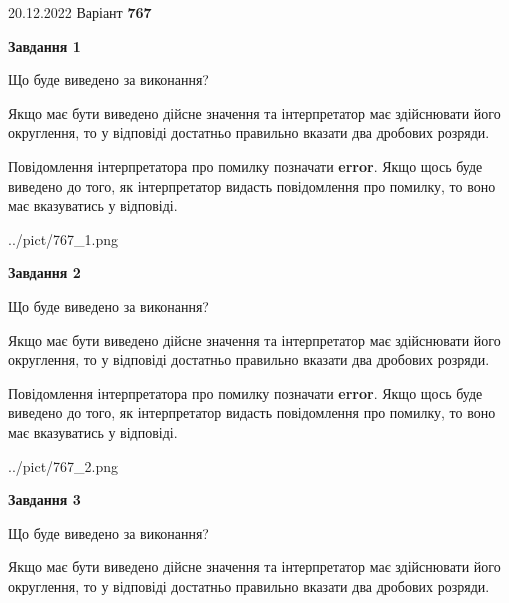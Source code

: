 \documentclass[12pt, ukrainian]{article}
\begin{document}
{20.12.2022 Варіант \No \textbf { 767 }\par}
{
\begin {Large}

{\begin {center}\textbf{Завдання 1}\end {center}}\par
Що буде виведено за виконання? \par

Якщо має бути виведено дійсне значення та інтерпретатор має здійснювати його округлення, 
то у відповіді достатньо правильно вказати два дробових розряди.

Повідомлення інтерпретатора про помилку позначати \textbf{error}.
Якщо щось буде виведено до того, як інтерпретатор видасть повідомлення про помилку, 
то воно має вказуватись у відповіді. \par

\begin{center}
	{../pict/767_1.png}
\end{center}
\newpage

{\begin {center}\textbf{Завдання 2}\end {center}}\par
Що буде виведено за виконання? \par

Якщо має бути виведено дійсне значення та інтерпретатор має здійснювати його округлення, 
то у відповіді достатньо правильно вказати два дробових розряди.

Повідомлення інтерпретатора про помилку позначати \textbf{error}.
Якщо щось буде виведено до того, як інтерпретатор видасть повідомлення про помилку, 
то воно має вказуватись у відповіді. \par

\begin{center}
	{../pict/767_2.png}
\end{center}
\newpage

{\begin {center}\textbf{Завдання 3}\end {center}}\par
Що буде виведено за виконання? \par

Якщо має бути виведено дійсне значення та інтерпретатор має здійснювати його округлення, 
то у відповіді достатньо правильно вказати два дробових розряди.


\end{Large}}
\end{document}
